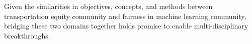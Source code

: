 \documentclass[11pt]{article}
\begin{document}
Given the similarities in objectives, concepts, and methods between transportation equity community and fairness in machine learning community, bridging these two domains together holds promise to enable multi-disciplinary breakthroughs. 


\begin{thebibliography}{10}
\itemsep=1pt
\begin{small}
		

\end{small}
\end{thebibliography} 	



% 






\end{document}
